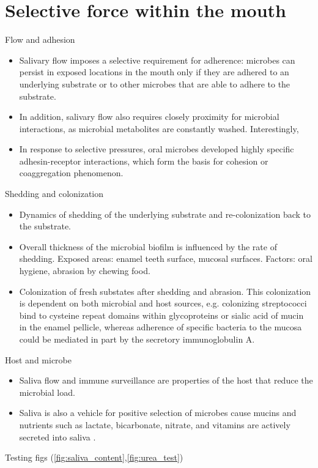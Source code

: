 \section{Selective force within the mouth}
Flow and adhesion
\begin{itemize}
    \item Salivary flow imposes a selective requirement for adherence: microbes can persist in exposed locations in the 
    mouth only if they are adhered to an underlying substrate or to other microbes that are able to adhere to the substrate. 
    \item In addition, salivary flow also requires closely proximity for microbial interactions, as microbial metabolites 
    are constantly washed. Interestingly,  
    \item In response to selective pressures, oral microbes developed highly specific adhesin-receptor interactions, 
    which form the basis for cohesion or coaggregation phenomenon. 
\end{itemize}
Shedding and colonization
\begin{itemize}
    \item Dynamics of shedding of the underlying substrate and re-colonization back to the substrate.
    \item Overall thickness of the microbial biofilm is influenced by the rate of shedding. Exposed areas: enamel teeth 
    surface, mucosal surfaces. Factors: oral hygiene, abrasion by chewing food. 
    \item Colonization of fresh substates after shedding and abrasion. This colonization is dependent on both microbial 
    and host sources, e.g. colonizing streptococci bind to cysteine repeat domains within glycoproteins or sialic acid of 
    mucin in the enamel pellicle, whereas adherence of specific bacteria to the mucosa could be mediated in part by the secretory 
    immunoglobulin A.
\end{itemize}
Host and microbe
\begin{itemize}
    \item Saliva flow and immune surveillance are properties of the host that reduce the microbial load. 
    \item Saliva is also a vehicle for positive selection of microbes cause mucins and nutrients such as lactate, 
    bicarbonate, nitrate, and vitamins are actively secreted into saliva \cite{Carpenter2020}.
\end{itemize}

Testing figs (\autoref{fig:saliva_content},\autoref{fig:urea_test})

